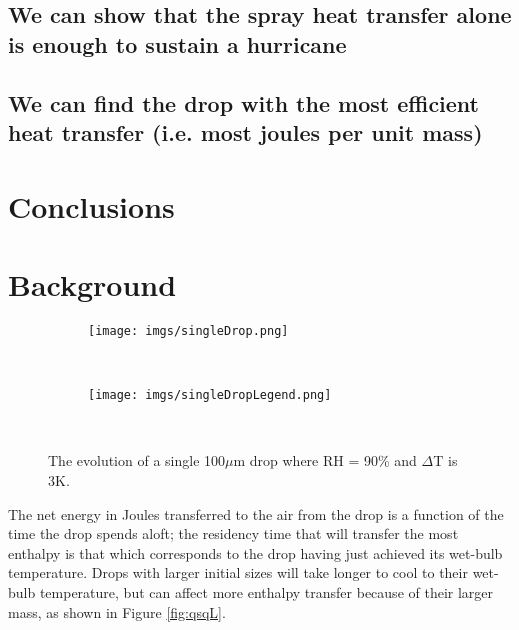 \documentclass[10pt,a4paper]{article}
\begin{document}
\subsection{We can show that the spray heat transfer alone is enough to sustain a hurricane}

\subsection{We can find the drop with the most efficient heat transfer (i.e. most joules per unit mass)}

\section{Conclusions} 


 \section{Background}









 
 
\begin{figure}[h!]
    \centering
    \begin{subfigure}[t!]{0.75\textwidth}
        \texttt{[image: imgs/singleDrop.png]}        
    \end{subfigure}
    ~ %
    \begin{subfigure}[t!]{0.2\textwidth}
        \texttt{[image: imgs/singleDropLegend.png]}        
    \end{subfigure}
    ~ %
       \caption{The evolution of a single 100$\mu$m drop where RH = 90\% and $\Delta$T is 3K.  }
       \label{fig:singleDrop}
\end{figure}

The net energy in Joules transferred to the air from the drop is a function of the time the drop spends aloft; the residency time that will transfer the most enthalpy is that which corresponds to the drop having just achieved its wet-bulb temperature. Drops with larger initial sizes will take longer to cool to their wet-bulb temperature, but can affect more enthalpy transfer because of their larger mass, as shown in Figure \ref{fig:qsqL}. 
\end{document}
